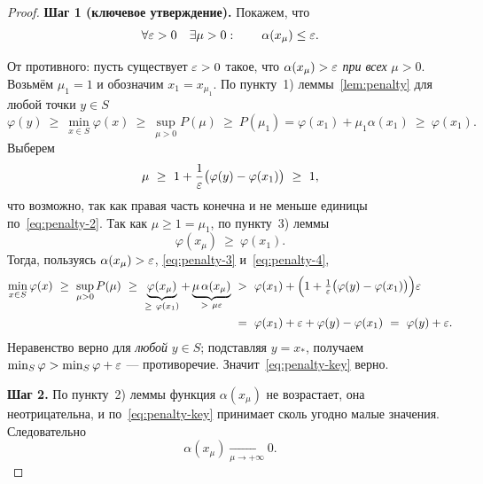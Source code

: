 \begin{proof}
\textbf{Шаг 1 (ключевое утверждение).} Покажем, что
\begin{equation}\label{eq:penalty-key}
  \forall \varepsilon > 0 \quad \exists \mu > 0 : \qquad \alpha(x_\mu) \le \varepsilon .
\end{equation}

От противного: пусть существует $\varepsilon > 0$ такое, что
$\alpha(x_\mu) > \varepsilon$ \emph{при всех} $\mu > 0$. Возьмём $\mu_1 = 1$ и
обозначим $x_1 = x_{\mu_1}$. По пункту~1) леммы~\ref{lem:penalty} для любой
точки $y \in S$
\begin{equation}\label{eq:penalty-2}
  \varphi(y) \ \ge\ \min_{x \in S}\varphi(x) \ \ge\ \sup_{\mu > 0} P(\mu)
  \ \ge\ P(\mu_1) = \varphi(x_1) + \mu_1 \alpha(x_1) \ \ge\ \varphi(x_1) .
\end{equation}
Выберем
\begin{equation}\label{eq:penalty-3}
  \mu \ \ge\ 1 + \frac{1}{\eps}\big(\varphi(y) - \varphi(x_1)\big) \ \ge\ 1 ,
\end{equation}
что возможно, так как правая часть конечна и не меньше единицы
по~\eqref{eq:penalty-2}. Так как $\mu \ge 1 = \mu_1$, по пункту~3) леммы
\begin{equation}\label{eq:penalty-4}
  \varphi(x_\mu) \ \ge\ \varphi(x_1) .
\end{equation}
Тогда, пользуясь $\alpha(x_\mu) > \varepsilon$, \eqref{eq:penalty-3}
и~\eqref{eq:penalty-4},
\begin{align*}
  \min_{x \in S}\varphi(x)
  \ \ge\ \sup_{\mu>0} P(\mu)
  \ \ge\ \underbrace{\varphi(x_\mu)}_{\ge\ \varphi(x_1)}
       + \underbrace{\mu\,\alpha(x_\mu)}_{>\ \mu\varepsilon}
  &\ >\ \varphi(x_1)
       + \Big(1 + \tfrac{1}{\varepsilon}\big(\varphi(y) - \varphi(x_1)\big)\Big)\varepsilon \\
  &\ =\ \varphi(x_1) + \varepsilon + \varphi(y) - \varphi(x_1)
   \ =\ \varphi(y) + \varepsilon .
\end{align*}
Неравенство верно для \emph{любой} $y \in S$; подставляя $y = x_*$, получаем
$\min_S \varphi > \min_S \varphi + \varepsilon$ — противоречие.
Значит~\eqref{eq:penalty-key} верно.

\medskip
\textbf{Шаг 2.} По пункту~2) леммы функция $\alpha(x_\mu)$ не возрастает, она
неотрицательна, и по~\eqref{eq:penalty-key} принимает сколь угодно малые
значения. Следовательно
\[
  \alpha(x_\mu) \xrightarrow[\mu \to +\infty]{} 0 .
\]


\end{proof}
